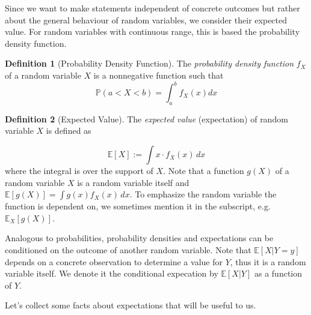 \documentclass[10pt]{article}
\theoremstyle{definition}
\newtheorem{mydef}{Definition}[section]
\begin{document}

Since we want to make statements independent of concrete outcomes but rather
about the general behaviour of random variables, we consider their expected
value. For random variables with continuous range, this is based the probability
density function.


\begin{mydef}[Probability Density Function]
  The \textit{probability density function} $f_X$ of a random variable $X$ is a
  nonnegative function such that
  $$
  \mathbb{P}(a < X < b) = \int_a^b f_X(x) dx
  $$
\end{mydef} 

\begin{mydef}[Expected Value]
  The \emph{expected value} (expectation) of random variable \(X\) is
  defined as
  
  \[ \mathbb{E}[X] := \int x \cdot
    f_X(x) \, dx
  \]
  where the integral is over the support of $X$. Note that a function \(g(X)\)
  of a random variable \(X\) is a random variable itself and
  $\mathbb{E}[g(X)] = {\int g(x)f_X(x) \, dx}$. To emphasize the random
  variable the function is dependent on, we sometimes mention it in the
  subscript, e.g. $\mathbb{E}_X[g(X)]$.
\end{mydef}

Analogous to probabilities, probability densities and expectations can be
conditioned on the outcome of another random variable.
%
Note that $\mathbb{E}[X|Y = y]$  depends on a concrete observation to
determine a value for \(Y\), thus it is a random variable itself. We
denote it the conditional expecation by \(\mathbb{E}[X|Y]\) as a function of $Y$.

Let's collect some facts about expectations that will be useful to
us.
\end{document}
